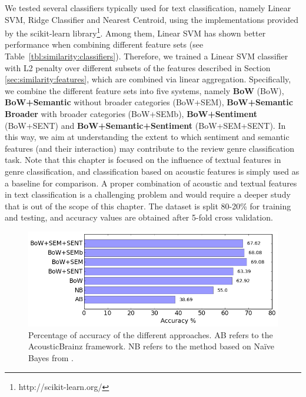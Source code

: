 We tested several classifiers typically used for text classification, namely Linear SVM, Ridge Classifier and Nearest Centroid, using the implementations provided by the scikit-learn library\footnote{http://scikit-learn.org/}. Among them, Linear SVM has shown better performance when combining different feature sets (see Table~\ref{tbl:similarity:classifiers}). Therefore, we trained a Linear SVM classifier with L2 penalty over different subsets of the features described in Section \ref{sec:similarity:features}, which are combined via linear aggregation. Specifically, we combine the different feature sets into five systems, namely \textbf{BoW} (BoW), \textbf{BoW+Semantic} without broader categories (BoW+SEM), \textbf{BoW+Semantic Broader} with broader categories (BoW+SEMb), \textbf{BoW+Sentiment} (BoW+SENT) and \textbf{BoW+Semantic+Sentiment} (BoW+SEM+SENT). In this way, we aim at understanding the extent to which sentiment and semantic features (and their interaction) may contribute to the review genre classification task. Note that this chapter is focused on the influence of textual features in genre classification, and classification based on acoustic features is simply used as a baseline for comparison. A proper combination of acoustic and textual features in text classification is a challenging problem and would require a deeper study that is out of the scope of this chapter.
The dataset is split 80-20\% for training and testing, and accuracy values are obtained after 5-fold cross validation. 

\begin{figure}
    \centering
    \includegraphics[width=\columnwidth]{ch06_similarity_pics/results2.png}
    \caption{Percentage of accuracy of the different approaches. AB refers to the AcousticBrainz framework. NB refers to the method based on Na\"{i}ve Bayes from \cite{Hu2005}.}
    \label{fig:similarity:results}
\end{figure}

